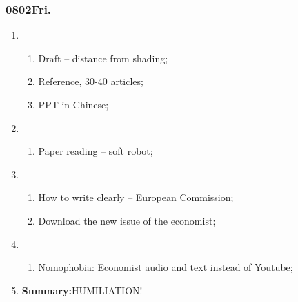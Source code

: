 \subsubsection{0802Fri.}
\begin{enumerate}
	\item \ncquaone
	\begin{enumerate}[(1)]
		\item Draft -- distance from shading;\rightundoneBlack
		\item Reference, 30-40 articles;\rightundoneBlack
		\item PPT in Chinese;\rightundoneBlack
	\end{enumerate}
	
	\item \ncquatwo	
	\begin{enumerate}[(1)]
		\item Paper reading -- soft robot;\rightundoneBlack
	\end{enumerate}
	
	\item \ncquathree
	\begin{enumerate}[(1)]
		\item How to write clearly -- European Commission;\rightdone 
		\item Download the new issue of the economist;\rightdone
	\end{enumerate}
	
	\item \ncquafour	
	\begin{enumerate}[(1)]
		\item Nomophobia: Economist audio and text instead of Youtube;\rightundoneBlack
	\end{enumerate}
	\item \textbf{Summary:}HUMILIATION! 
\end{enumerate}
